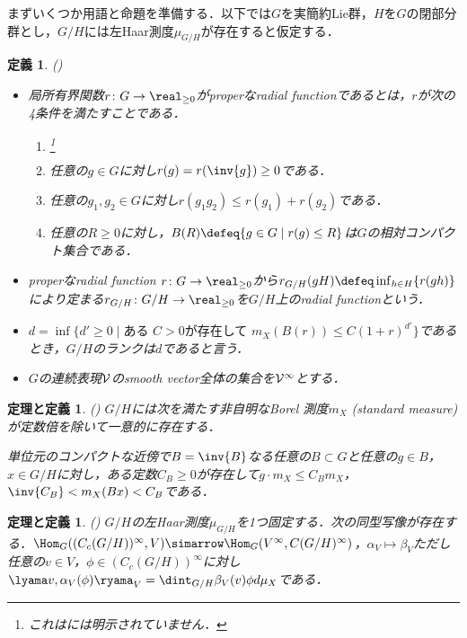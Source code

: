 \documentclass[12pt,dvipdfmx,uplatex]{jsarticle}
\newcounter{countabst}
\newtheorem{thmdef-a}[countabst]{定理と定義}
\newtheorem{def-a}[countabst]{定義}
\begin{document}
まずいくつか用語と命題を準備する．以下では$G$を実簡約Lie群，$H$を$G$の閉部分群とし，$G/H$には左Haar測度$\mu_{G/H} $が存在すると仮定する．
\begin{def-a}(\cite{ber88})
  \leavevmode\vspace{-1em}
  \begin{itemize}
  \item 局所有界関数$r\colon G\to \real_{\geq 0} $がproperなradial functionであるとは，$r$が次の4条件を満たすことである．
    \begin{enumerate}
    \item {}\footnote{これは\cite{ber88}には明示されていません．}
    \item 任意の$g\in G$に対し$r(g) = r(\inv{g})\geq 0  $である．
    \item 任意の$g_1,g_2\in G$に対し$r(g_1g_2)\leq r(g_1) + r(g_2)  $である．
    \item 任意の$R\geq 0$に対し，$B(R)\defeq \{g\in G\mid r(g)\leq R \} $は$G$の相対コンパクト集合である．
    \end{enumerate}
  \item properなradial function $r\colon G\to \real_{\geq 0} $から$r_{G/H}(gH)\defeq \inf_{h\in H}\{r(gh) \}$により定まる${r_{G/H}\colon G/H\to \real_{\geq 0}}$を$G/H$上のradial functionという．
  \item $d = \inf\{d'\geq 0\mid \text{ある } C > 0\text{が存在して }  m_X(B(r))\leq C(1+r)^{d'}\} $であるとき，$G/H$のランクは$d$であると言う．
  \item $G$の連続表現$\cal{V} $のsmooth vector全体の集合を$\cal{V}^{\infty} $とする．
  \end{itemize}
\end{def-a}
\begin{thmdef-a}(\cite[p.~683]{ber88})
  $G/H$には次を満たす非自明なBorel 測度$m_X $ (standard measure) が定数倍を除いて一意的に存在する．

  単位元のコンパクトな近傍で$B = \inv{B} $なる任意の$B\subset G$と任意の$g\in B$，$x\in G/H$に対し，ある定数$C_B\geq 0 $が存在して$g\cdot m_X \leq C_B m_X$，$ \inv{C_B} < m_X(Bx) < C_{B}$である．
\end{thmdef-a}
\begin{thmdef-a}(\cite[p.~678]{ber88})
  $G/H$の左Haar測度$\mu_{G/H} $を1つ固定する．次の同型写像が存在する．$\Hom_{G}((C_c(G/H))^{\infty}, V )\simarrow \Hom_{G}(V^{\infty}, C(G/H)^{\infty}) $，$\alpha_V\mapsto \beta_V$ただし任意の$v\in V$，$\phi \in  (C_c(G/H))^{\infty} $に対し$ \lyama v,\alpha_V(\phi)\ryama_{V} = \dint_{G/H}\beta_V(v)\phi d\mu_X  $である．
\end{thmdef-a}
\end{document}
